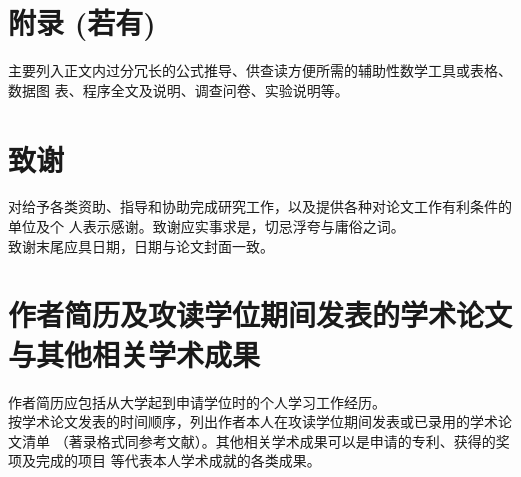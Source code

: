 \section{附录 (若有)}

主要列入正文内过分冗长的公式推导、供查读方便所需的辅助性数学工具或表格、数据图
表、程序全文及说明、调查问卷、实验说明等。

\section{致谢}

对给予各类资助、指导和协助完成研究工作，以及提供各种对论文工作有利条件的单位及个
人表示感谢。致谢应实事求是，切忌浮夸与庸俗之词。\\
致谢末尾应具日期，日期与论文封面一致。

\section{作者简历及攻读学位期间发表的学术论文与其他相关学术成果}

作者简历应包括从大学起到申请学位时的个人学习工作经历。\\
按学术论文发表的时间顺序，列出作者本人在攻读学位期间发表或已录用的学术论文清单
（著录格式同参考文献）。其他相关学术成果可以是申请的专利、获得的奖项及完成的项目
等代表本人学术成就的各类成果。
